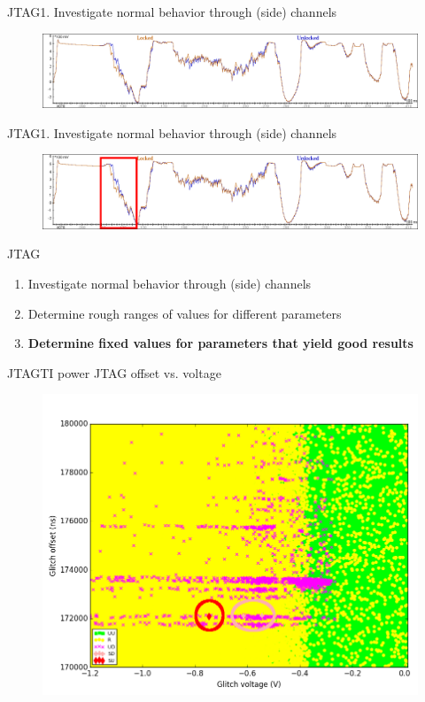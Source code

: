 \documentclass[table]{beamer}
\begin{document}
\begin{frame}{JTAG}{1. Investigate normal behavior through (side) channels }
    \begin{figure}[H]
      \centering
      \includegraphics[width=\textwidth]{../plots/tms57-trace2.png}
    \end{figure}
\end{frame}

\begin{frame}{JTAG}{1. Investigate normal behavior through (side) channels }
    \begin{figure}[H]
      \centering
      \includegraphics[width=\textwidth]{../plots/tms57-trace2-2.png}
    \end{figure}
\end{frame}


\begin{frame}{JTAG}
    \begin{enumerate}
        \item Investigate normal behavior through (side) channels 
        \item Determine rough ranges of values for different parameters
        \item \textbf{Determine fixed values for parameters that yield good results}
    \end{enumerate}
\end{frame}

\begin{frame}{JTAG}{TI power JTAG offset vs. voltage}
    \vspace{-.3cm}
    \begin{figure}[H]
      \centering
      \includegraphics[width=.8\textwidth]{../../plots/newplots/ti-jtag-voltage-offset.png}
    \end{figure}
\end{frame}
\end{document}

